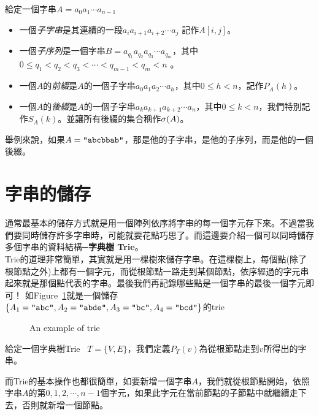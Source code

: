 \documentclass[a4paper,12pt]{book}
\begin{document}
\begin{theorem}[定義]
  給定一個字串$A = a_0 a_1 \cdots a_{n-1}$
\begin{itemize}
  \item 一個\emph{子字串}是其連續的一段$a_i a_{i+1} a_{i+2} \cdots a_j$ 記作$A[i,j]$。
\item 一個\emph{子序列}是一個字串$B = a_{q_1} a_{q_2} a_{q_3} \cdots a_{q_m}$，其中$0 \leq q_1 < q_2 < q_3 < \cdots < q_{m-1} < q_m < n$ 。
\item 一個$A$的\emph{前綴}是$A$的一個子字串$a_0 a_1 a_2 \cdots a_{h}$，其中$0 \leq h < n$，記作$P_A(h)$。
\item 一個$A$的\emph{後綴}是$A$的一個子字串$a_k a_{k+1} a_{k+2} \cdots a_n$，其中$0 \leq k < n$，我們特別記作$S_A(k)$。並讓所有後綴的集合稱作$\operatorname{\sigma}(A)$。
\end{itemize}
\end{theorem}
舉例來說，如果$A = \texttt{"abcbbab"}$，那是他的子字串，是他的子序列，而是他的一個後綴。

\section{字串的儲存}
通常最基本的儲存方式就是用一個陣列依序將字串的每一個字元存下來。不過當我們要同時儲存許多字串時，可能就要花點巧思了。而這邊要介紹一個可以同時儲存多個字串的資料結構─{\bf  字典樹 Trie}。\\
Trie的道理非常簡單，其實就是用一棵樹來儲存字串。在這棵樹上，每個點(除了根節點之外)上都有一個字元，而從根節點一路走到某個節點，依序經過的字元串起來就是那個點代表的字串。最後我們再記錄哪些點是一個字串的最後一個字元即可！
如Figure~\ref{fig:trie}就是一個儲存$\{A_1 = \texttt{"abc"}, A_2 =\texttt{"abde"}, A_3 = \texttt{"bc"}, A_4 = \texttt{"bcd"}\}$的trie
\begin{figure}[H]
  \centering
  \caption{An example of trie}
  \label{fig:trie}
\end{figure}
%
\begin{theorem}[定義]
  給定一個字典樹Trie \  $T = \{V, E\}$，我們定義$P_T(v)$為從根節點走到$v$所得出的字串。
\end{theorem}
而Trie的基本操作也都很簡單，如要新增一個字串$A$，我們就從根節點開始，依照字串$A$的第$0, 1, 2, \cdots, n-1$個字元，如果此字元在當前節點的子節點中就繼續走下去，否則就新增一個節點。
\end{document}

